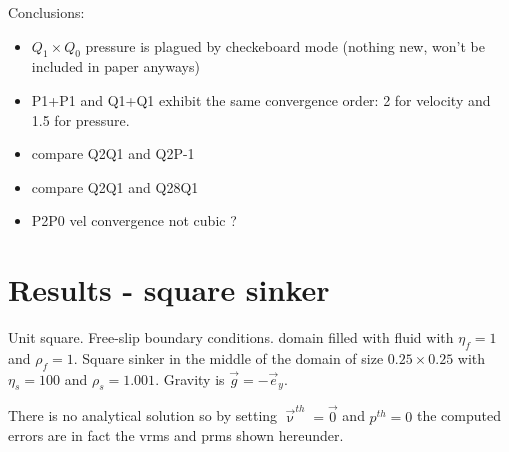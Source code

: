 \vspace{1cm}

Conclusions:
\begin{itemize}
\item $Q_1\times Q_0$ pressure is plagued by checkeboard mode (nothing new, won't be included in paper anyways)
\item P1+P1 and Q1+Q1 exhibit the same convergence order: 2 for velocity and 1.5 for pressure.
\item compare Q2Q1 and Q2P-1
\item compare Q2Q1 and Q28Q1
\item P2P0 vel convergence not cubic ?
\end{itemize}






\newpage
\section*{Results - square sinker}

Unit square. Free-slip boundary conditions. domain filled with fluid with $\eta_f=1$ and $\rho_f=1$.
Square sinker in the middle of the domain of size $0.25\times 0.25$ with $\eta_s=100$ and
$\rho_s=1.001$. Gravity is $\vec{g}=-\vec{e}_y$. 

There is no analytical solution so by setting $\vec{\upnu}^{th}=\vec{0}$ and 
$p^{th}=0$ the computed errors are in fact the vrms and prms shown hereunder.





